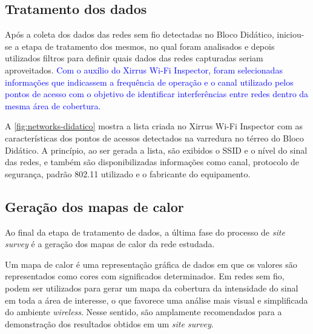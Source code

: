 \subsection{Tratamento dos dados}
\label{subsec:tratamento-dos-dados}

Após a coleta dos dados das redes sem fio detectadas no Bloco Didático, iniciou-se a etapa de tratamento dos mesmos, no qual foram analisados e depois utilizados filtros para definir quais dados das redes capturadas seriam aproveitados. \textcolor{blue}{Com o auxílio do Xirrus Wi-Fi Inspector, foram selecionadas informações que indicassem a frequência de operação e o canal utilizado pelos pontos de acesso com o objetivo de identificar interferências entre redes dentro da mesma área de cobertura.}

A \autoref{fig:networks-didatico} mostra a lista criada no Xirrus Wi-Fi Inspector com as características dos pontos de acessos detectados na varredura no térreo do Bloco Didático. A princípio, ao ser gerada a lista, são exibidos o SSID e o nível do sinal das redes, e também são disponibilizadas informações como canal, protocolo de segurança, padrão 802.11 utilizado e o fabricante do equipamento.

\begin{figure}[H]
	\centering
\end{figure}

\subsection{Geração dos mapas de calor}
\label{subsec:mapas-de-calor}

Ao final da etapa de tratamento de dados, a última fase do processo de \textit{site survey} é a geração dos mapas de calor da rede estudada.

Um mapa de calor é uma representação gráfica de dados em que os valores são representados como cores com significados determinados. Em redes sem fio, podem ser utilizados para gerar um mapa da cobertura da intensidade do sinal em toda a área de interesse, o que favorece uma análise mais visual e simplificada do ambiente \textit{wireless}. Nesse sentido, são amplamente recomendados para a demonstração dos resultados obtidos em um \textit{site survey}.

